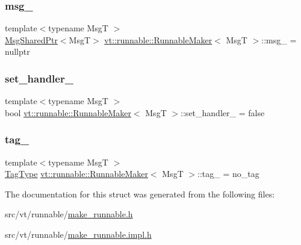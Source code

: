 \mbox{\label{structvt_1_1runnable_1_1_runnable_maker_aa8d73c577b47287104b9d87e4228ed37}} 
\subsubsection{\texorpdfstring{msg\+\_\+}{msg\_}}
{\footnotesize\ttfamily template$<$typename MsgT $>$ \\
\hyperlink{namespacevt_ab2b3d506ec8e8d1540aede826d84a239}{Msg\+Shared\+Ptr}$<$MsgT$>$ \hyperlink{structvt_1_1runnable_1_1_runnable_maker}{vt\+::runnable\+::\+Runnable\+Maker}$<$ MsgT $>$\+::msg\+\_\+ = nullptr\hspace{0.3cm}{\ttfamily [private]}}

\mbox{\label{structvt_1_1runnable_1_1_runnable_maker_a52fd27acc3c3259743fdd7aed09d690d}} 
\subsubsection{\texorpdfstring{set\+\_\+handler\+\_\+}{set\_handler\_}}
{\footnotesize\ttfamily template$<$typename MsgT $>$ \\
bool \hyperlink{structvt_1_1runnable_1_1_runnable_maker}{vt\+::runnable\+::\+Runnable\+Maker}$<$ MsgT $>$\+::set\+\_\+handler\+\_\+ = false\hspace{0.3cm}{\ttfamily [private]}}

\mbox{\label{structvt_1_1runnable_1_1_runnable_maker_a5d76922354a61ff8d94eb734960fb64b}} 
\subsubsection{\texorpdfstring{tag\+\_\+}{tag\_}}
{\footnotesize\ttfamily template$<$typename MsgT $>$ \\
\hyperlink{namespacevt_a84ab281dae04a52a4b243d6bf62d0e52}{Tag\+Type} \hyperlink{structvt_1_1runnable_1_1_runnable_maker}{vt\+::runnable\+::\+Runnable\+Maker}$<$ MsgT $>$\+::tag\+\_\+ = no\+\_\+tag\hspace{0.3cm}{\ttfamily [private]}}



The documentation for this struct was generated from the following files\+:\begin{DoxyCompactItemize}
\item 
src/vt/runnable/\hyperlink{make__runnable_8h}{make\+\_\+runnable.\+h}\item 
src/vt/runnable/\hyperlink{make__runnable_8impl_8h}{make\+\_\+runnable.\+impl.\+h}\end{DoxyCompactItemize}
